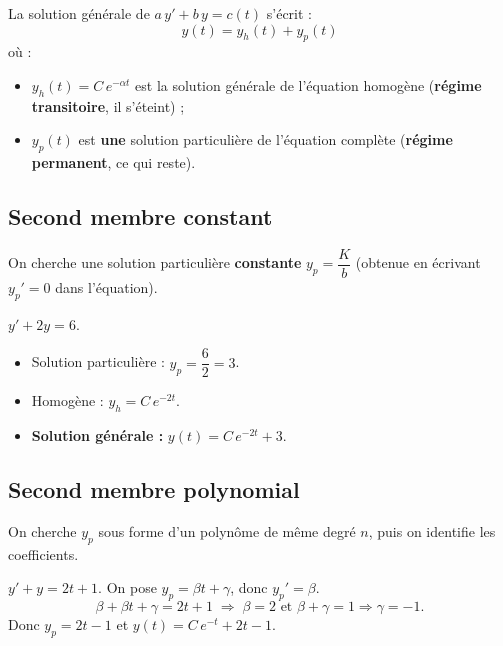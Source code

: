 \documentclass[a4paper,11pt]{article}
\begin{document}
\begin{theoreme}
La solution générale de $a\,y' + b\,y = c(t)$ s'écrit :
\[
\boxed{y(t) = y_h(t) + y_p(t)}
\]
où :
\begin{itemize}
  \item $y_h(t) = C\,e^{-\alpha t}$ est la solution générale de l'équation homogène (\textbf{régime transitoire}, il s'éteint) ;
  \item $y_p(t)$ est \textbf{une} solution particulière de l'équation complète (\textbf{régime permanent}, ce qui reste).
\end{itemize}
\end{theoreme}

\subsection{Second membre constant}

\begin{methode}[-- $c(t) = K$ (constante), avec $b \neq 0$]
On cherche une solution particulière \textbf{constante} $y_p = \dfrac{K}{b}$ (obtenue en écrivant $y_p' = 0$ dans l'équation).
\end{methode}

\begin{exemple}
$y' + 2y = 6$.
\begin{itemize}
  \item Solution particulière : $y_p = \dfrac{6}{2} = 3$.
  \item Homogène : $y_h = C\,e^{-2t}$.
  \item \textbf{Solution générale :} $y(t) = C\,e^{-2t} + 3$.
\end{itemize}
\end{exemple}

\subsection{Second membre polynomial}

\begin{methode}
On cherche $y_p$ sous forme d'un polynôme de même degré $n$, puis on identifie les coefficients.
\end{methode}

\begin{exemple}
$y' + y = 2t + 1$. On pose $y_p = \beta t + \gamma$, donc $y_p' = \beta$.
\[
\beta + \beta t + \gamma = 2t + 1 \;\Rightarrow\; \beta = 2 \text{ et } \beta + \gamma = 1 \Rightarrow \gamma = -1.
\]
Donc $y_p = 2t - 1$ et $y(t) = C\,e^{-t} + 2t - 1$.
\end{exemple}
\end{document}
